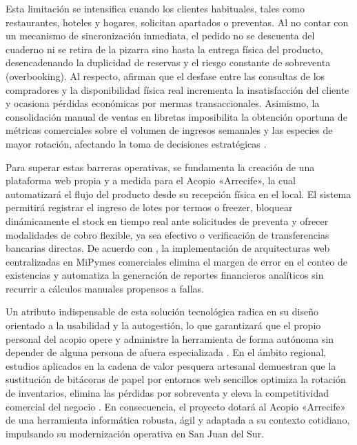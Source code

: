 Esta limitación se intensifica cuando los clientes habituales, tales como restaurantes, hoteles y hogares, solicitan apartados o preventas. Al no contar con un mecanismo de sincronización inmediata, el pedido no se descuenta del cuaderno ni se retira de la pizarra sino hasta la entrega física del producto, desencadenando la duplicidad de reservas y el riesgo constante de sobreventa (overbooking). Al respecto, \textcite{villasmil2021} afirman que el desfase entre las consultas de los compradores y la disponibilidad física real incrementa la insatisfacción del cliente y ocasiona pérdidas económicas por mermas transaccionales. Asimismo, la consolidación manual de ventas en libretas imposibilita la obtención oportuna de métricas comerciales sobre el volumen de ingresos semanales y las especies de mayor rotación, afectando la toma de decisiones estratégicas \parencite{laudon2020}.

Para superar estas barreras operativas, se fundamenta la creación de una plataforma web propia y a medida para el Acopio «Arrecife», la cual automatizará el flujo del producto desde su recepción física en el local. El sistema permitirá registrar el ingreso de lotes por termos o freezer, bloquear dinámicamente el stock en tiempo real ante solicitudes de preventa y ofrecer modalidades de cobro flexible, ya sea efectivo o verificación de transferencias bancarias directas. De acuerdo con \textcite{mayorga2024}, la implementación de arquitecturas web centralizadas en MiPymes comerciales elimina el margen de error en el conteo de existencias y automatiza la generación de reportes financieros analíticos sin recurrir a cálculos manuales propensos a fallas.

Un atributo indispensable de esta solución tecnológica radica en su diseño orientado a la usabilidad y la autogestión, lo que garantizará que el propio personal del acopio opere y administre la herramienta de forma autónoma sin depender de alguna persona de afuera especializada \parencite{davis1989,goalglobal2021}. En el ámbito regional, estudios aplicados en la cadena de valor pesquera artesanal demuestran que la sustitución de bitácoras de papel por entornos web sencillos optimiza la rotación de inventarios, elimina las pérdidas por sobreventa y eleva la competitividad comercial del negocio \parencite{goalglobal2021,pressman2021}. En consecuencia, el proyecto dotará al Acopio «Arrecife» de una herramienta informática robusta, ágil y adaptada a su contexto cotidiano, impulsando su modernización operativa en San Juan del Sur.

